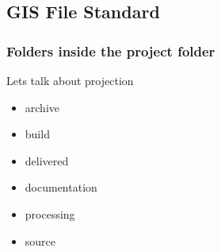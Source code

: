 \documentclass[class=book , crop=false]{standalone}
\title{}  %
\begin{document}
\ifstandalone
\maketitle %
\tableofcontents %
\clearpage
\fi

\subsection{GIS File Standard}

\subsubsection{ Folders inside the project folder}

Lets talk about \gls{projection}
\begin{itemize}
\item archive
\item build
\item delivered
\item documentation
\item processing
\item source
\end{itemize}
\end{document}
